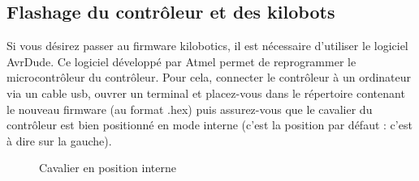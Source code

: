\documentclass[a4paper,8pt]{report}
\begin{document}
\begin{center}
\end{center}

\subsection*{Flashage du contr\^oleur et des kilobots}\label{sec:name}

Si vous d\'esirez passer au firmware kilobotics, il est n\'ecessaire d'utiliser le logiciel AvrDude. Ce logiciel d\'evelopp\'e par Atmel permet de reprogrammer le microcontr\^oleur du contr\^oleur. Pour cela, connecter le contr\^oleur \`a un ordinateur via un cable usb, ouvrer un terminal et placez-vous dans le r\'epertoire contenant le nouveau firmware (au format .hex) puis assurez-vous que le cavalier du contr\^oleur est bien positionn\'e en mode interne (c'est la position par d\'efaut : c'est \`a dire sur la gauche). \\

\begin{figure}[!h]
    \centering
    \caption{Cavalier en position interne}
\end{figure}
\end{document}
